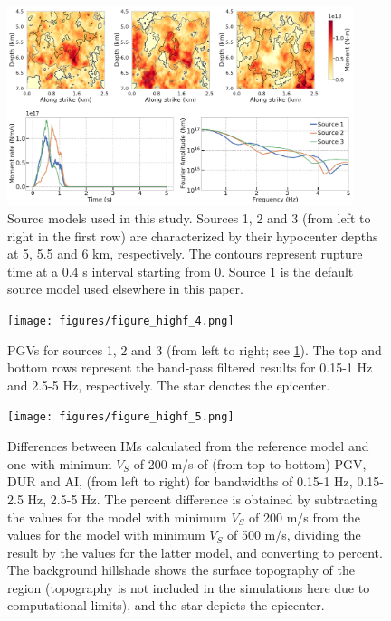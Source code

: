 \begin{figure}[!ht]
  \includegraphics[width=0.9\textwidth,height=0.9\textheight,keepaspectratio]{figures/figure_highf_3.pdf}
  \caption{Source models used in this study. Sources 1, 2 and 3 (from left to right in the first row) are characterized by their hypocenter depths at 5, 5.5 and 6 km, respectively. The contours represent rupture time at a 0.4 s interval starting from 0. Source 1 is the default source model used elsewhere in this paper.}
  \label{fig:highf-3}
\end{figure}
\clearpage

\begin{figure}[!ht]
  \texttt{[image: figures/figure\_highf\_4.png]}
  \caption{PGVs for sources 1, 2 and 3 (from left to right; see \cref{fig:highf-3}). The top and bottom rows represent the band-pass filtered results for 0.15-1 Hz and 2.5-5 Hz, respectively. The star denotes the epicenter.}
  \label{fig:highf-4}
\end{figure}
\clearpage

\begin{figure}[!ht]
  \centering
  \texttt{[image: figures/figure\_highf\_5.png]}
  \caption{Differences between IMs calculated from the reference model and one with minimum $V_S$ of 200 m/s of (from top to bottom) PGV, DUR and AI, (from left to right) for bandwidths of 0.15-1 Hz, 0.15-2.5 Hz, 2.5-5 Hz. The percent difference is obtained by subtracting the values for the model with minimum $V_S$ of 200 m/s from the values for the model with minimum $V_S$ of 500 m/s, dividing the result by the values for the latter model, and converting to percent. The background hillshade shows the surface topography of the region (topography is not included in the simulations here due to computational limits), and the star depicts the epicenter.}
  \label{fig:highf-5}
\end{figure}
\clearpage

